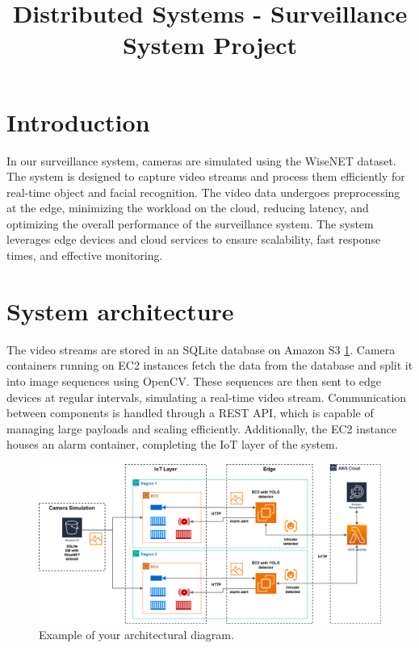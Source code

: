 \documentclass[conference]{IEEEtran}
\begin{document}
\title{Distributed Systems - Surveillance System Project}

\author{
\and
{}
\and
{}
}

\maketitle

\section{Introduction}
In our surveillance system, cameras are simulated using the WiseNET dataset. The system is designed to capture video streams and process them efficiently for real-time object and facial recognition. The video data undergoes preprocessing at the edge, minimizing the workload on the cloud, reducing latency, and optimizing the overall performance of the surveillance system. The system leverages edge devices and cloud services to ensure scalability, fast response times, and effective monitoring.  

\section{System architecture}
The video streams are stored in an SQLite database on Amazon S3 \ref{fig:architecture}. Camera containers running on EC2 instances fetch the data from the database and split it into image sequences using OpenCV. These sequences are then sent to edge devices at regular intervals, simulating a real-time video stream. Communication between components is handled through a REST API, which is capable of managing large payloads and scaling efficiently. Additionally, the EC2 instance houses an alarm container, completing the IoT layer of the system.

\begin{figure}[h!]
    \centering
    \includegraphics[width=1\linewidth]{DS_architecture.png}
    \caption{Example of your architectural diagram.}
    \label{fig:architecture}
\end{figure}
\end{document}
